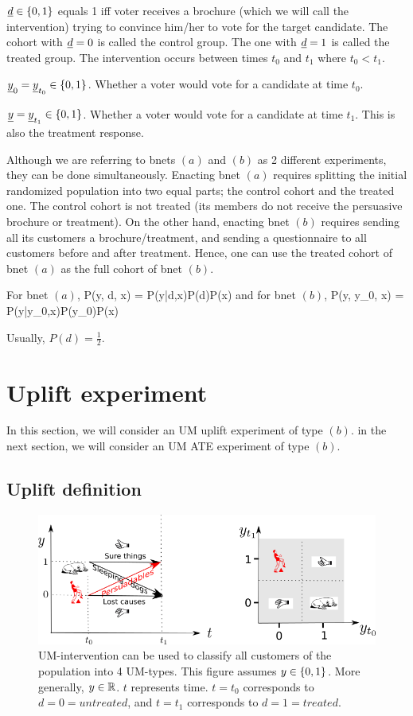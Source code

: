 $\rvd\in\bool$ equals 1 iff voter receives
a brochure (which
we will call the intervention) trying to convince him/her to vote 
for the target  candidate. The cohort with $\rvd=0$ is called the control group. The one with $\rvd=1$ is called the treated group.
The intervention occurs between times $t_0$ and $t_1$
where $t_0<t_1$.

$\rvy_0=\rvy_{t_0}\in \bool$. Whether a voter would
vote for a candidate at time $t_0$.

$\rvy=\rvy_{t_1}\in \bool$. Whether a voter would
vote for a candidate at time $t_1$. This is also
the treatment response.

Although we are referring to bnets $(a)$
and $(b)$ as 2 different experiments, they can be done
simultaneously. Enacting
bnet $(a)$ requires splitting the initial 
randomized population into two equal parts;
the control cohort and the treated one.
The control cohort is not treated (its members do
not receive the persuasive brochure or treatment). On the other hand, enacting bnet $(b)$ requires
sending all its customers a brochure/treatment,
and sending a questionnaire to all 
customers before and after treatment.
Hence, one can use the treated cohort of
bnet $(a)$ as the full cohort of bnet $(b)$.

For bnet $(a)$, 
\beq
P(y, d, x) = P(y|d,x)P(d)P(x)
\eeq
and for bnet $(b)$,
\beq
P(y, y_0, x) = P(y|y_0,x)P(y_0)P(x)
\eeq

Usually, $P(d) = \frac{1}{2}$.


\section{Uplift experiment}
In this section, we will consider an UM 
uplift experiment of type $(b)$.
in the next section, we will
consider an UM ATE experiment of type $(b)$.

\subsection{Uplift definition}

\begin{figure}[h!]
\centering
\includegraphics[width=6in]
{uplift/uplift-y-t-up.png}
\caption{UM-intervention
can be used to classify
all customers of the
population into 4 UM-types.
This figure 
assumes $y\in \{0,1\}$.
More generally, $y\in { \mathbb{R}}$.
$t$ represents time. $t=t_0$
corresponds to $d=0=untreated$,
and $t=t_1$ corresponds to $d=1=treated$.} 
\label{fig-uplift-y-t}
\end{figure}

